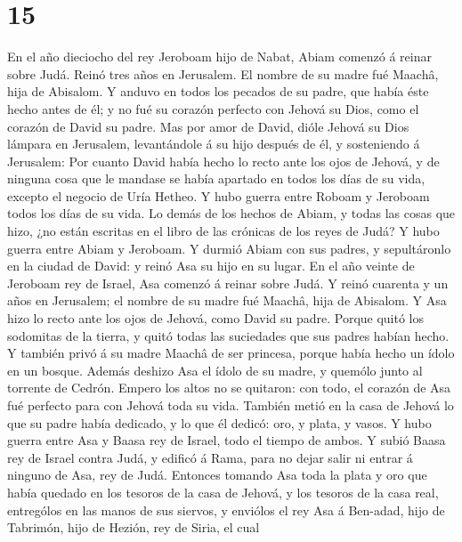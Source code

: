 \hypertarget{section-14}{%
\section{15}\label{section-14}}

 En el año dieciocho del rey Jeroboam hijo de Nabat, Abiam
comenzó á reinar sobre Judá.  Reinó tres años en Jerusalem.
El nombre de su madre fué Maachâ, hija de Abisalom.  Y
anduvo en todos los pecados de su padre, que había éste hecho antes de
él; y no fué su corazón perfecto con Jehová su Dios, como el corazón de
David su padre.  Mas por amor de David, dióle Jehová su Dios
lámpara en Jerusalem, levantándole á su hijo después de él, y
sosteniendo á Jerusalem:  Por cuanto David había hecho lo
recto ante los ojos de Jehová, y de ninguna cosa que le mandase se había
apartado en todos los días de su vida, excepto el negocio de Uría
Hetheo.  Y hubo guerra entre Roboam y Jeroboam todos los
días de su vida.  Lo demás de los hechos de Abiam, y todas
las cosas que hizo, ¿no están escritas en el libro de las crónicas de
los reyes de Judá? Y hubo guerra entre Abiam y Jeroboam.  Y
durmió Abiam con sus padres, y sepultáronlo en la ciudad de David: y
reinó Asa su hijo en su lugar.  En el año veinte de Jeroboam
rey de Israel, Asa comenzó á reinar sobre Judá.  Y reinó
cuarenta y un años en Jerusalem; el nombre de su madre fué Maachâ, hija
de Abisalom.  Y Asa hizo lo recto ante los ojos de Jehová,
como David su padre.  Porque quitó los sodomitas de la
tierra, y quitó todas las suciedades que sus padres habían hecho.
 Y también privó á su madre Maachâ de ser princesa, porque
había hecho un ídolo en un bosque. Además deshizo Asa el ídolo de su
madre, y quemólo junto al torrente de Cedrón.  Empero los
altos no se quitaron: con todo, el corazón de Asa fué perfecto para con
Jehová toda su vida.  También metió en la casa de Jehová lo
que su padre había dedicado, y lo que él dedicó: oro, y plata, y vasos.
 Y hubo guerra entre Asa y Baasa rey de Israel, todo el
tiempo de ambos.  Y subió Baasa rey de Israel contra Judá,
y edificó á Rama, para no dejar salir ni entrar á ninguno de Asa, rey de
Judá.  Entonces tomando Asa toda la plata y oro que había
quedado en los tesoros de la casa de Jehová, y los tesoros de la casa
real, entrególos en las manos de sus siervos, y enviólos el rey Asa á
Ben-adad, hijo de Tabrimón, hijo de Hezión, rey de Siria, el cual
